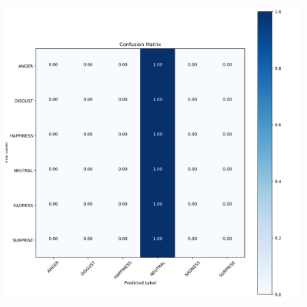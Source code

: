 \begin{figure}[H]
	\centering
	\includegraphics[width=.95\textwidth]{assets/results/preMELD.vgg/vgg16_finetune/confusion_matrix.png}
	
	\label{fig:cm5}
\end{figure}
